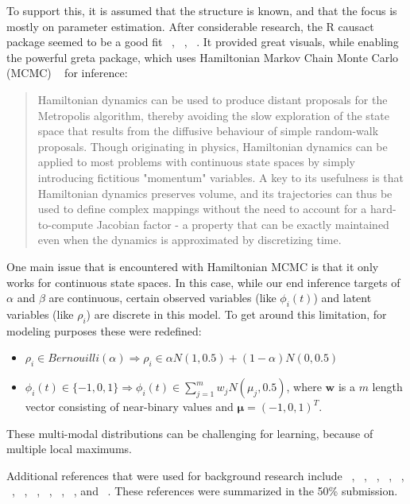\documentclass[a4paper, 11pt]{report}
\begin{document}
	To support this, it is assumed that the structure is known, and that the focus is mostly on parameter estimation. After considerable research, the R causact package seemed to be a good fit ~\cite{causact}, ~\cite{fleischhacker2022}, ~\cite{golding2022}. It provided great visuals, while enabling the powerful greta package, which uses Hamiltonian Markov Chain Monte Carlo (MCMC) ~\cite{radford2010} for inference:
	\begin{quote}
		Hamiltonian dynamics can be used to produce distant proposals for the Metropolis algorithm, thereby avoiding the slow exploration of the state space that results from the diffusive behaviour of simple random-walk proposals. Though originating in physics, Hamiltonian dynamics can be applied to most problems with continuous state spaces by simply introducing fictitious "momentum" variables. A key to its usefulness is that Hamiltonian dynamics preserves volume, and its trajectories can thus be used to define complex mappings without the need to account for a hard-to-compute Jacobian factor - a property that can be exactly maintained even when the dynamics is approximated by discretizing time.
	\end{quote}
	
	One main issue that is encountered with Hamiltonian MCMC is that it only works for continuous state spaces. In this case, while our end inference targets of $\alpha$ and $\beta$ are continuous, certain observed variables (like $\phi_{i}(t)$) and latent variables (like $\rho_{i}$) are discrete in this model. To get around this limitation, for modeling purposes these were redefined:
	\begin{itemize}
		\item $\rho_{i} \in Bernouilli(\alpha) \Longrightarrow \rho_{i} \in \alpha N(1,0.5) + (1-\alpha)N(0,0.5)$\\
		\item $\phi_{i}(t) \in \lbrace -1, 0, 1 \rbrace \Longrightarrow \phi_{i}(t) \in \sum_{j=1}^{m} w_{j} N(\mu_{j},0.5)$, where $\mathbf{w}$ is a $m$ length vector consisting of near-binary values and $\boldsymbol{\mu} = (-1,0,1)^{T}$.\\
	\end{itemize}
	
	These multi-modal distributions can be challenging for learning, because of multiple local maximums.
	
	Additional references that were used for background research include ~\cite{koller2009}, ~\cite{coursera}, ~\cite{sun2013}, ~\cite{abramson2016}, ~\cite{lafferty2001}, ~\cite{thai2018}, ~\cite{neogi2019}, ~\cite{ling2019},  ~\cite{scutari2021},  ~\cite{guo2021},  ~\cite{suter2021}, and ~\cite{mohammadi2021}. These references were summarized in the 50\% submission.
	
\end{document}
